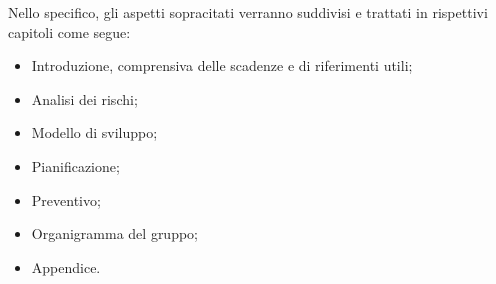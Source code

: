 Nello specifico, gli aspetti sopracitati verranno suddivisi e trattati in rispettivi capitoli come segue:
    \begin{itemize}
        \item Introduzione, comprensiva delle scadenze e di riferimenti utili;
        \item Analisi dei rischi;
        \item Modello di sviluppo;
        \item Pianificazione;
        \item Preventivo;
        \item Organigramma del gruppo;
        \item Appendice.
    \end{itemize}